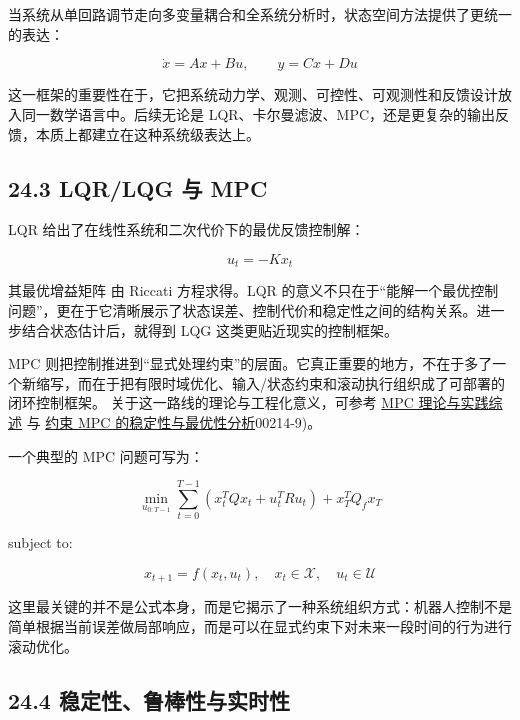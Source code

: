 当系统从单回路调节走向多变量耦合和全系统分析时，状态空间方法提供了更统一的表达：

\begin{equation*}
\dot{x} = Ax + Bu,\qquad y = Cx + Du
\end{equation*}

这一框架的重要性在于，它把系统动力学、观测、可控性、可观测性和反馈设计放入同一数学语言中。后续无论是 LQR、卡尔曼滤波、MPC，还是更复杂的输出反馈，本质上都建立在这种系统级表达上。

\subsection*{24.3 LQR/LQG 与 MPC}


LQR 给出了在线性系统和二次代价下的最优反馈控制解：

\begin{equation*}
u_t = -Kx_t
\end{equation*}

其最优增益矩阵 \texttt{} 由 Riccati 方程求得。LQR 的意义不只在于“能解一个最优控制问题”，更在于它清晰展示了状态误差、控制代价和稳定性之间的结构关系。进一步结合状态估计后，就得到 LQG 这类更贴近现实的控制框架。

MPC 则把控制推进到“显式处理约束”的层面。它真正重要的地方，不在于多了一个新缩写，而在于把有限时域优化、输入/状态约束和滚动执行组织成了可部署的闭环控制框架。 关于这一路线的理论与工程化意义，可参考 \href{https://authors.library.caltech.edu/records/cqy11-6np77}{MPC 理论与实践综述} 与 \href{https://doi.org/10.1016/S0005-1098(99}{约束 MPC 的稳定性与最优性分析}00214-9)。

一个典型的 MPC 问题可写为：

\begingroup
\footnotesize
\begin{equation*}
\min_{u_{0:T-1}} \sum_{t=0}^{T-1} (x_t^TQx_t + u_t^TRu_t) + x_T^TQ_fx_T
\end{equation*}
\endgroup

subject to:

\begingroup
\footnotesize
\begin{equation*}
x_{t+1} = f(x_t, u_t),\quad x_t \in \mathcal{X},\quad u_t \in \mathcal{U}
\end{equation*}
\endgroup

这里最关键的并不是公式本身，而是它揭示了一种系统组织方式：机器人控制不是简单根据当前误差做局部响应，而是可以在显式约束下对未来一段时间的行为进行滚动优化。

\subsection*{24.4 稳定性、鲁棒性与实时性}


